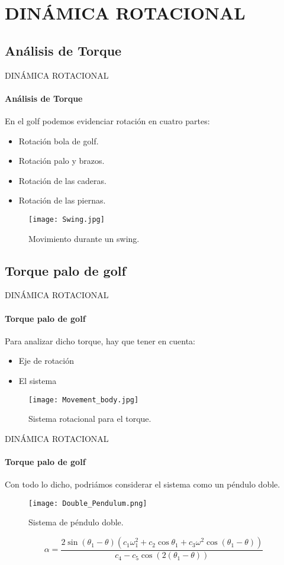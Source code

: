 \section{DINÁMICA ROTACIONAL}
\subsection{Análisis de Torque}
\begin{frame}{DINÁMICA ROTACIONAL}
\framesubtitle{Análisis de Torque}
	En el golf podemos evidenciar rotación en cuatro partes:
    \begin{itemize}
    \item Rotación bola de golf.
    \item Rotación palo y brazos.
    \item Rotación de las caderas.
    \item Rotación de las piernas.
    \end{itemize}

	\begin{figure}[H]
      \centering
      \texttt{[image: Swing.jpg]}
      \caption{Movimiento durante un swing\footnotemark{}.}
    \end{figure}
     \vspace{-2cm}
\end{frame}

\subsection{Torque palo de golf}
\begin{frame}{DINÁMICA ROTACIONAL}
\framesubtitle{Torque palo de golf}
Para analizar dicho torque, hay que tener en cuenta:\begin{itemize}
\item Eje de rotación
\item El sistema
\end{itemize}
\begin{figure}[H]
      \centering
      \texttt{[image: Movement\_body.jpg]}
      \caption{Sistema rotacional para el torque.}
\end{figure}
\end{frame}

\begin{frame}{DINÁMICA ROTACIONAL}
\framesubtitle{Torque palo de golf}
Con todo lo dicho, podriámos considerar el sistema como un péndulo doble.
\begin{figure}[H]
      \centering
      \texttt{[image: Double\_Pendulum.png]}
      \caption{Sistema de péndulo doble.}
\end{figure}
\begin{equation}
\alpha =\frac { 2\sin { ({ \theta  }_{ 1 }-\theta )\left( { { c }_{ 1 } }{ \omega  }_{ 1 }^{ 2 }+c_{ 2 }\cos { { \theta  }_{ 1 } } +{ c }_{ 3 }{ \omega  }^{ 2 }\cos { \left( { { \theta  }_{ 1 }-\theta  } \right)  }  \right)  }  }{ { c }_{ 4 }-{ c }_{ 5 }\cos { (2\left( { \theta  }_{ 1 }-\theta  \right) ) }  } 
\end{equation}
\end{frame}
